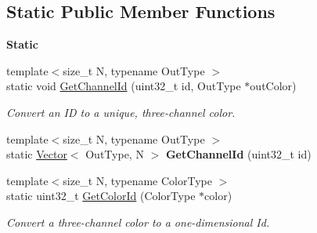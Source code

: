 \subsection*{Static Public Member Functions}
\begin{Indent}\textbf{ Static}\par
\begin{DoxyCompactItemize}
\item 
\mbox{\label{classrev_1_1_mouse_picker_aa7d459c701b98d06468d0ba7205f000f}} 
{\footnotesize template$<$size\+\_\+t N, typename Out\+Type $>$ }\\static void \mbox{\hyperlink{classrev_1_1_mouse_picker_aa7d459c701b98d06468d0ba7205f000f}{Get\+Channel\+Id}} (uint32\+\_\+t id, Out\+Type $\ast$out\+Color)
\begin{DoxyCompactList}\small\item\em Convert an ID to a unique, three-\/channel color. \end{DoxyCompactList}\item 
\mbox{\label{classrev_1_1_mouse_picker_aa948b50521b57682f59dcb1e509c8135}} 
{\footnotesize template$<$size\+\_\+t N, typename Out\+Type $>$ }\\static \mbox{\hyperlink{classrev_1_1_vector}{Vector}}$<$ Out\+Type, N $>$ {\bfseries Get\+Channel\+Id} (uint32\+\_\+t id)
\item 
\mbox{\label{classrev_1_1_mouse_picker_a92a58d878cb80c71152205f2b926ad11}} 
{\footnotesize template$<$size\+\_\+t N, typename Color\+Type $>$ }\\static uint32\+\_\+t \mbox{\hyperlink{classrev_1_1_mouse_picker_a92a58d878cb80c71152205f2b926ad11}{Get\+Color\+Id}} (Color\+Type $\ast$color)
\begin{DoxyCompactList}\small\item\em Convert a three-\/channel color to a one-\/dimensional Id. \end{DoxyCompactList}\end{DoxyCompactItemize}
\end{Indent}
